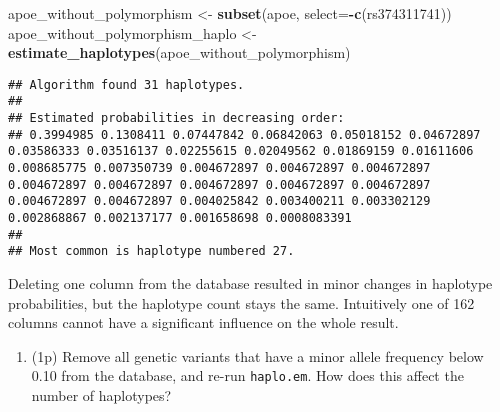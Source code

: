 \documentclass[
]{article}
\newenvironment{Shaded}{\begin{snugshade}}{\end{snugshade}}
\newcommand{\DataTypeTok}[1]{\textcolor[rgb]{0.13,0.29,0.53}{#1}}
\newcommand{\KeywordTok}[1]{\textcolor[rgb]{0.13,0.29,0.53}{\textbf{#1}}}
\newcommand{\NormalTok}[1]{#1}
\newcommand{\OperatorTok}[1]{\textcolor[rgb]{0.81,0.36,0.00}{\textbf{#1}}}
\newcommand{\StringTok}[1]{\textcolor[rgb]{0.31,0.60,0.02}{#1}}
\providecommand{\tightlist}{%
  \setlength{\itemsep}{0pt}\setlength{\parskip}{0pt}}
\begin{document}
\begin{Shaded}
\begin{Highlighting}[]
\NormalTok{apoe_without_polymorphism <-}\StringTok{ }\KeywordTok{subset}\NormalTok{(apoe, }\DataTypeTok{select=}\OperatorTok{-}\KeywordTok{c}\NormalTok{(rs374311741))}
\NormalTok{apoe_without_polymorphism_haplo <-}\StringTok{ }\KeywordTok{estimate_haplotypes}\NormalTok{(apoe_without_polymorphism)}
\end{Highlighting}
\end{Shaded}

\begin{verbatim}
## Algorithm found 31 haplotypes.
## 
## Estimated probabilities in decreasing order:
## 0.3994985 0.1308411 0.07447842 0.06842063 0.05018152 0.04672897 0.03586333 0.03516137 0.02255615 0.02049562 0.01869159 0.01611606 0.008685775 0.007350739 0.004672897 0.004672897 0.004672897 0.004672897 0.004672897 0.004672897 0.004672897 0.004672897 0.004672897 0.004672897 0.004025842 0.003400211 0.003302129 0.002868867 0.002137177 0.001658698 0.0008083391
## 
## Most common is haplotype numbered 27.
\end{verbatim}

Deleting one column from the database resulted in minor changes in
haplotype probabilities, but the haplotype count stays the same.
Intuitively one of 162 columns cannot have a significant influence on
the whole result.

\begin{enumerate}
\def\labelenumi{\arabic{enumi}.}
\setcounter{enumi}{6}
\tightlist
\item
  (1p) Remove all genetic variants that have a minor allele frequency
  below 0.10 from the database, and re-run \texttt{haplo.em}. How does
  this affect the number of haplotypes?
\end{enumerate}
\end{document}
